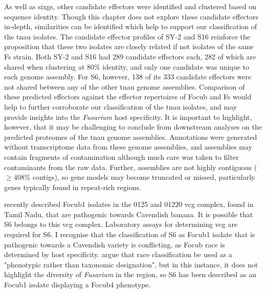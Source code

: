 As well as \acp{sixg}, other candidate effectors were identified and clustered based on sequence identity. Though this chapter does not explore these candidate effectors in-depth, similarities can be identified which help to support our classification of the \ac{tnau} isolates. The candidate effector profiles of SY-2 and S16 reinforce the proposition that these two isolates are closely related if not isolates of the same \ac{Fs} strain. Both SY-2 and S16 had 289 candidate effectors each, 282 of which are shared when clustering at 80\% identity, and only one candidate was unique to each genome assembly. For S6, however, 138 of its 333 candidate effectors were not shared between any of the other \ac{tnau} genome assemblies. Comparison of these predicted effectors against the effector repertoires of \ac{Focub} and \ac{Fs} would help to further corroborate our classification of the \ac{tnau} isolates, and may provide insights into the \textit{Fusarium} host specificity. It is important to highlight, however, that it may be challenging to conclude from downstream analyses on the predicted proteomes of the \ac{tnau} genome assemblies. Annotations were generated without transcriptome data from these genome assemblies, and assemblies may contain fragments of contamination although much care was taken to filter contaminants from the raw data. Further, assemblies are not highly contiguous ($ \geq408\% $ contigs), so gene models may become truncated or missed, particularly genes typically found in repeat-rich regions. 

\textcite{Thangavelu2020} recently described \ac{Focub1} isolates in the 0125 and 01220 \ac{vcg} complex, found in Tamil Nadu, that are pathogenic towards Cavendish banana. It is possible that S6 belongs to this \ac{vcg} complex. Laboratory assays for determining \ac{vcg} are required for S6. I recognise that the classification of S6 as \ac{Focub1} isolate that is pathogenic towards a Cavendish variety is conflicting, as \ac{Focub} race is determined by host specificity. \textcite{Torres2021} argue that race classification be used as a "phenotypic rather than taxonomic designation", but in this instance, it does not highlight the diversity of \textit{Fusarium} in the region, so S6 has been described as an \ac{Focub1} isolate displaying a \ac{Focub4} phenotype.

